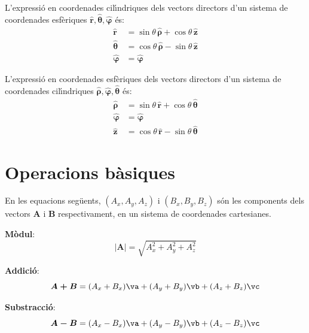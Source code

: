 \documentclass[catalan,a4paper,twoside,11pt]{article}
\begin{document}
L'expressi\'{o} en coordenades cil\'{\i}ndriques dels vectors directors d'un sistema de coordenades  esf\`{e}riques $\boldsymbol{\hat{r}},\boldsymbol{\hat{\theta}},\boldsymbol{\hat{\varphi}}$ \'{e}s:
\begin{subequations}\begin{align}
    \boldsymbol{\hat{r}} &=\sin\theta\,\boldsymbol{\hat{\rho}}+\cos\theta\,\boldsymbol{\hat{z}}\\
    \boldsymbol{\hat{\theta}}
    &=\cos\theta\,\boldsymbol{\hat{\rho}}-\sin\theta\,\boldsymbol{\hat{z}}\\
    \boldsymbol{\hat{\varphi}}&=\boldsymbol{\hat{\varphi}}
\end{align}\end{subequations}

L'expressi\'{o} en coordenades esf\`{e}riques dels vectors directors d'un sistema de coordenades  cil\'{\i}ndriques $\boldsymbol{\hat{\rho}},\boldsymbol{\hat{\varphi}},\boldsymbol{\hat{\theta}}$ \'{e}s:
\begin{subequations}\begin{align}
    \boldsymbol{\hat{\rho}} &=\sin\theta\,\boldsymbol{\hat{r}}+
    \cos\theta\,\boldsymbol{\hat{\theta}}\\
    \boldsymbol{\hat{\varphi}}&=\boldsymbol{\hat{\varphi}}\\
    \boldsymbol{\hat{z}} &=\cos\theta\,\boldsymbol{\hat{r}}-
    \sin\theta\,\boldsymbol{\hat{\theta}}
\end{align}\end{subequations}


\section{Operacions  b\`{a}siques}

En les equacions seg\"{u}ents, $(A_x,A_y,A_z)$ i $(B_x,B_y,B_z)$
s\'{o}n les components dels vectors $\boldsymbol{A}$ i
$\boldsymbol{B}$ respectivament, en un sistema de coordenades
cartesianes.

\textbf{M\`{o}dul}:
\begin{equation}
    |\boldsymbol{A}|=  \sqrt{A_x^2 + A_y^2 + A_z^2}
\end{equation}

\textbf{Addici\'{o}}:
\begin{equation}
    \boldsymbol{A+B}= (A_x+B_x)\va + (A_y+B_y)\vb + (A_z+B_z)\vc
\end{equation}

\textbf{Substracci\'{o}}:
\begin{equation}
    \boldsymbol{A-B}= (A_x-B_x)\va + (A_y-B_y)\vb + (A_z-B_z)\vc
\end{equation}
\end{document}
